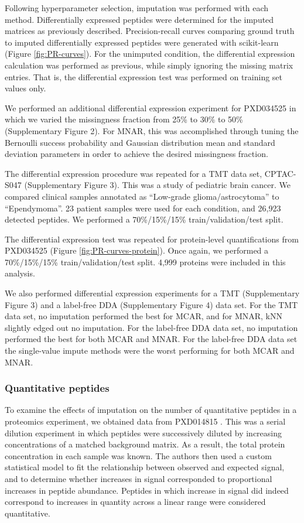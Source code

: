 \documentclass{article}
\begin{document}
Following hyperparameter selection, imputation was performed with each method. Differentially expressed peptides were determined for the imputed matrices as previously described. Precision-recall curves comparing ground truth to imputed differentially expressed peptides were generated with scikit-learn (Figure \ref{fig:PR-curves}). For the unimputed condition, the differential expression calculation was performed as previous, while simply ignoring the missing matrix entries. That is, the differential expression test was performed on training set values only.

We performed an additional differential expression experiment for PXD034525 in which we varied the missingness fraction from 25\% to 30\% to 50\% (Supplementary Figure 2). For MNAR, this was accomplished through tuning the Bernoulli success probability and Gaussian distribution mean and standard deviation parameters in order to achieve the desired missingness fraction. 

The differential expression procedure was repeated for a TMT data set, CPTAC-S047 \cite{CPTAC-S047} (Supplementary Figure 3). This was a study of pediatric brain cancer. We compared clinical samples annotated as ``Low-grade glioma/astrocytoma'' to ``Ependymoma''. 23 patient samples were used for each condition, and 26,923 detected peptides. We performed a 70\%/15\%/15\% train/validation/test split.

The differential expression test was repeated for protein-level quantifications from PXD034525 (Figure \ref{fig:PR-curves-protein}). Once again, we performed a 70\%/15\%/15\% train/validation/test split. 4,999 proteins were included in this analysis.

We also performed differential expression experiments for a TMT (Supplementary Figure 3) and a label-free DDA (Supplementary Figure 4) data set. For the TMT data set, no imputation performed the best for MCAR, and for MNAR, kNN slightly edged out no imputation. For the label-free DDA data set, no imputation performed the best for both MCAR and MNAR. For the label-free DDA data set the single-value impute methods were the worst performing for both MCAR and MNAR.

\subsubsection{Quantitative peptides}

To examine the effects of imputation on the number of quantitative peptides in a proteomics experiment, we obtained data from PXD014815 \cite{matrix-matched-calib}. This was a serial dilution experiment in which peptides were successively diluted by increasing concentrations of a matched background matrix. As a result, the total protein concentration in each sample was known. The authors then used a custom statistical model to fit the relationship between observed and expected signal, and to determine whether increases in signal corresponded to proportional increases in peptide abundance. Peptides in which increase in signal did indeed correspond to increases in quantity across a linear range were considered quantitative.
\end{document}

